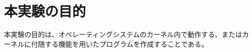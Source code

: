\documentclass[main]{subfiles}
\begin{document}
\section{本実験の目的}

本実験の目的は、オペレーティングシステムのカーネル内で動作する、またはカーネルに付随する機能を用いたプログラムを作成することである。
\end{document}
